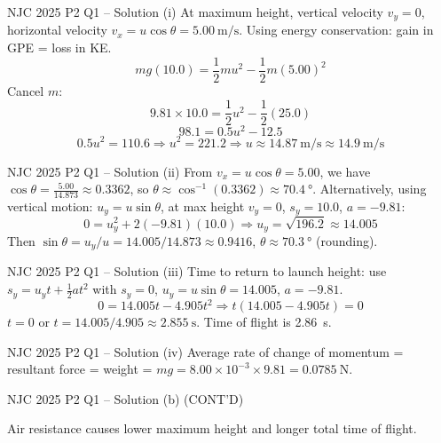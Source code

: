\documentclass{beamer}
\begin{document}
\begin{frame}[shrink=15]{NJC 2025 P2 Q1 – Solution (i)}
At maximum height, vertical velocity $v_y = 0$, horizontal velocity $v_x = u\cos\theta = \SI{5.00}{\meter\per\second}$.
Using energy conservation: gain in GPE = loss in KE.
\[ mg(10.0) = \frac12 m u^2 - \frac12 m (5.00)^2 \]
Cancel $m$:
\[ 9.81 \times 10.0 = \frac12 u^2 - \frac12 (25.0) \]
\[ 98.1 = 0.5 u^2 - 12.5 \]
\[ 0.5 u^2 = 110.6 \Rightarrow u^2 = 221.2 \Rightarrow u \approx \SI{14.87}{\meter\per\second} \approx \SI{14.9}{\meter\per\second} \]
\end{frame}

\begin{frame}[shrink=15]{NJC 2025 P2 Q1 – Solution (ii)}
From $v_x = u\cos\theta = 5.00$, we have $\cos\theta = \frac{5.00}{14.873} \approx 0.3362$, so $\theta \approx \cos^{-1}(0.3362) \approx \SI{70.4}{\degree}$.
Alternatively, using vertical motion:
$u_y = u\sin\theta$, at max height $v_y=0$, $s_y=10.0$, $a=-9.81$:
\[ 0 = u_y^2 + 2(-9.81)(10.0) \Rightarrow u_y = \sqrt{196.2} \approx 14.005 \]
Then $\sin\theta = u_y/u = 14.005/14.873 \approx 0.9416$, $\theta \approx \SI{70.3}{\degree}$ (rounding).
\end{frame}

\begin{frame}[shrink=15]{NJC 2025 P2 Q1 – Solution (iii)}
Time to return to launch height: use $s_y = u_y t + \frac12 a t^2$ with $s_y=0$, $u_y = u\sin\theta = 14.005$, $a=-9.81$.
\[ 0 = 14.005 t - 4.905 t^2 \Rightarrow t(14.005 - 4.905 t) = 0 \]
$t=0$ or $t = 14.005/4.905 \approx \SI{2.855}{\second}$.
Time of flight is \SI{2.86}{\second}.
\end{frame}

\begin{frame}[shrink=15]{NJC 2025 P2 Q1 – Solution (iv)}
Average rate of change of momentum = resultant force = weight = $mg = 8.00\times10^{-3} \times 9.81 = \SI{0.0785}{\newton}$.
\end{frame}

\begin{frame}[shrink=15]{NJC 2025 P2 Q1 – Solution (b) (CONT'D)}
\begin{center}
\end{center}
Air resistance causes lower maximum height and longer total time of flight.
\end{frame}
\end{document}
